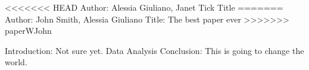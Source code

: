 <<<<<<< HEAD
Author: Alessia Giuliano, Janet Tick
Title
=======
Author: John Smith, Alessia Giuliano
Title: The best paper ever
>>>>>>> paperWJohn

Introduction: Not sure yet.
Data
Analysis
Conclusion: This is going to change the world.
